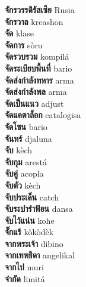 \textbf{ จักรวรรดิรัสเซีย  } Rusia \\
\textbf{ จักรวาล  } kreashon \\
\textbf{ จัด  } klase \\
\textbf{ จัดการ  } sòru \\
\textbf{ จัดรวบรวม  } kompilá \\
\textbf{ จัดระเบียบพื้นที่  } bario \\
\textbf{ จัดส่งกำลังทหาร  } arma \\
\textbf{ จัดส่งกำลังพล  } arma \\
\textbf{ จัดเป็นแนว  } adjust \\
\textbf{ จัดแคตาล็อก  } catalogisa \\
\textbf{ จัดโซน  } bario \\
\textbf{ จันทร์  } djaluna \\
\textbf{ จับ  } kèch \\
\textbf{ จับกุม  } arestá \\
\textbf{ จับคู่  } acopla \\
\textbf{ จับตัว  } kèch \\
\textbf{ จับประเด็น  } catch \\
\textbf{ จับระบำรำฟ้อน  } dansa \\
\textbf{ จับไว้แน่น  } kohe \\
\textbf{ จั๊กแร้  } kòkòdèk \\
\textbf{ จากพระเจ้า  } dibino \\
\textbf{ จากเทพธิดา  } angelikal \\
\textbf{ จากไป  } muri \\
\textbf{ จำกัด  } limitá \\
